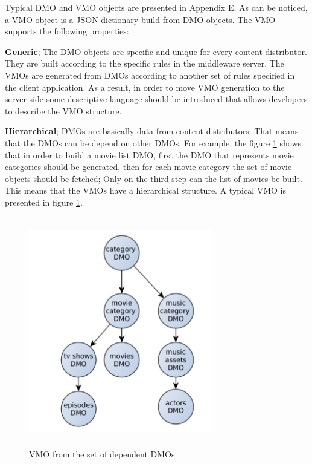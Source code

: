 
Typical DMO and VMO objects are presented in Appendix E. As can be noticed, a VMO object is a JSON dictionary build from DMO objects. The VMO supports the following properties:

\textbf{Generic}; The DMO objects are specific and unique for every content distributor. They are built according to the specific rules in the middleware server. The VMOs are generated from DMOs according to another set of rules specified in the client application. As a result, in order to move VMO generation to the server side some descriptive language should be introduced that allows developers to describe the VMO structure.

\textbf{Hierarchical}; DMOs are basically data from content distributors. That means that the DMOs can be depend on other DMOs. For example, the figure \ref{fig:vmo_example} shows that in order to build a movie list DMO, first the DMO that represents movie categories should be generated, then for each movie category the set of movie objects should be fetched; Only on the third step can the list of movies be built. This means that the VMOs have a hierarchical structure. A typical VMO is presented in figure \ref{fig:vmo_example}.

\begin{figure}[h]
    \centering
	\includegraphics[width=8cm,height=10cm,keepaspectratio]{images/vmo_example.png}
    \caption{VMO from the set of dependent DMOs}
    \label{fig:vmo_example}
\end{figure} 

